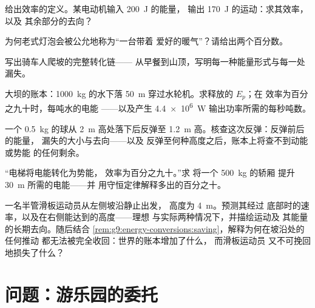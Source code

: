 \begin{exercise}[$\star$]\label{exo:g9:energy-conversions:6}
给出效率的定义。某电动机输入 \qty{200}{J} 的能量，
输出 \qty{170}{J} 的运动：求其效率，以及
其余部分的去向？
\end{exercise}

\begin{exercise}[$\star$]\label{exo:g9:energy-conversions:7}
为何老式灯泡会被公允地称为“一台带着
爱好的暖气”？请给出两个百分数。
\end{exercise}

\begin{exercise}[$\star$]\label{exo:g9:energy-conversions:8}
写出骑车人爬坡的完整转化链——
从早餐到山顶，写明每一种能量形式与每一处漏失。
\end{exercise}

\begin{exercise}[$\star\star$]\label{exo:g9:energy-conversions:9}
大坝的账本：\qty{1000}{kg} 的水下落 \qty{50}{m}
穿过水轮机。求释放的 $E_p$；在
效率为百分之九十时，每吨水的电能
——以及产生
\qty{4.4e6}{W} 输出功率所需的每秒吨数。
\end{exercise}

\begin{exercise}[$\star\star$]\label{exo:g9:energy-conversions:10}
一个 \qty{0.5}{kg} 的球从 \qty{2}{m} 高处落下后反弹至
\qty{1.2}{m} 高。核查这次反弹：反弹前后的能量，
漏失的大小与去向——以及
反弹至何种高度之后，账本上将查不到动能或势能
的任何剩余。
\end{exercise}

\begin{exercise}[$\star\star$]\label{exo:g9:energy-conversions:11}
“电梯将电能转化为势能，
效率为百分之九十。”求
将一个 \qty{500}{kg} 的轿厢
提升 \qty{30}{m} 所需的电能——并
用守恒定律解释多出的百分之十。
\end{exercise}

\begin{exercise}[$\star\star\star$]\label{exo:g9:energy-conversions:12}
一名半管滑板运动员从左侧坡沿静止出发，
高度为 \qty{4}{m}。预测其经过
底部时的速率，以及在右侧能达到的高度——理想
与实际两种情况下，并描绘运动及
其能量的长期去向。随后结合
\cref{rem:g9:energy-conversions:saving}，解释为何在坡沿处的任何推动
都无法被完全收回：世界的账本增加了什么，
而滑板运动员
又不可挽回地损失了什么？
\end{exercise}

\section{问题：游乐园的委托}

